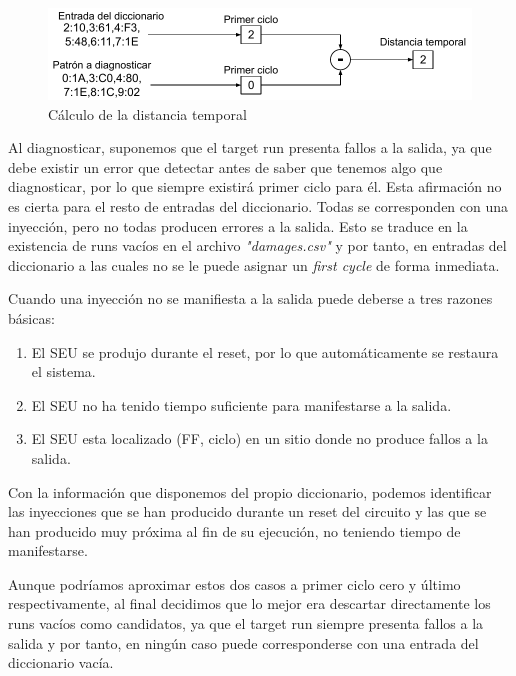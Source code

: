 \begin{figure}[htbp]
    \centering
    \includegraphics[width=0.95\linewidth]
    {Cycle/figuras/fig51.pdf}
    \caption{Cálculo de la distancia temporal}
    \label{fig:CycDist}
\end{figure}

Al diagnosticar, suponemos que el target run presenta fallos a la salida, ya que
debe existir un error que detectar antes de saber que tenemos algo que
diagnosticar, por lo que siempre existirá primer ciclo para él. Esta afirmación no
es cierta para el resto de entradas del diccionario. Todas se corresponden con una
inyección, pero no todas producen errores a la salida. Esto se traduce en la
existencia de runs vacíos en el archivo \textit{"damages.csv"} y por tanto, en
entradas del diccionario a las cuales no se le puede asignar un \textit{first
cycle} de forma inmediata.

Cuando una inyección no se manifiesta a la salida puede deberse a tres razones
básicas:
\begin{enumerate}
    \item El \gls{SEU} se produjo durante el reset, por lo que automáticamente se
        restaura el sistema.
    \item El \gls{SEU} no ha tenido tiempo suficiente para manifestarse a la
        salida.
    \item El \gls{SEU} esta localizado (FF, ciclo) en un sitio donde no produce
        fallos a la salida.
\end{enumerate}
Con la información que disponemos del propio diccionario, podemos identificar las
inyecciones que se han producido durante un reset del circuito y las que  se han
producido muy próxima al fin de su ejecución, no teniendo tiempo de manifestarse.

Aunque podríamos aproximar estos dos casos a primer ciclo cero y último
respectivamente, al final decidimos que lo mejor era descartar directamente los
runs vacíos como candidatos, ya que el target run siempre presenta fallos a la
salida y por tanto, en ningún caso puede corresponderse con una entrada del
diccionario vacía.

